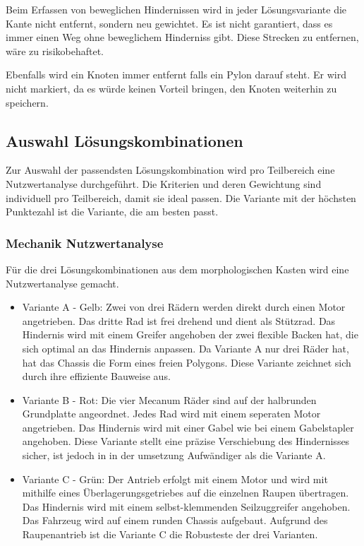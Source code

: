Beim Erfassen von beweglichen Hindernissen wird in jeder Lösungsvariante die Kante nicht entfernt, sondern neu gewichtet. Es ist nicht garantiert, dass es immer einen Weg ohne beweglichem Hinderniss gibt. Diese Strecken zu entfernen, wäre zu risikobehaftet.

Ebenfalls wird ein Knoten immer entfernt falls ein Pylon darauf steht. Er wird nicht markiert, da es würde keinen Vorteil bringen, den Knoten weiterhin zu speichern.


\newpage
\subsection{Auswahl Lösungskombinationen}\label{nutzwertanalyse}

Zur Auswahl der passendsten Lösungskombination wird pro Teilbereich eine Nutzwertanalyse durchgeführt. Die Kriterien und deren Gewichtung sind individuell pro Teilbereich, damit sie ideal passen. Die Variante mit der höchsten Punktezahl ist die Variante, die am besten passt.

\subsubsection{Mechanik Nutzwertanalyse}

Für die  drei Lösungskombinationen aus dem morphologischen Kasten wird eine Nutzwertanalyse gemacht.    

\begin{itemize}
    \item Variante A - Gelb: Zwei von drei Rädern werden direkt durch einen Motor angetrieben. Das dritte Rad ist frei drehend und dient als Stützrad. Das Hindernis wird mit einem Greifer angehoben der zwei flexible Backen hat, die sich optimal an das Hindernis anpassen. Da Variante A nur drei Räder hat, hat das Chassis die Form eines freien Polygons. Diese Variante zeichnet sich durch ihre effiziente Bauweise aus. 
    \item Variante B - Rot: Die vier Mecanum Räder sind auf der halbrunden Grundplatte angeordnet. Jedes Rad wird mit einem seperaten Motor angetrieben.  Das Hindernis wird mit einer Gabel wie bei einem Gabelstapler angehoben. Diese Variante stellt eine präzise Verschiebung des Hindernisses sicher, ist jedoch in in der umsetzung Aufwändiger als die Variante A. 
    \item Variante C - Grün: Der Antrieb erfolgt mit einem Motor und wird mit mithilfe eines Überlagerungsgetriebes auf die einzelnen Raupen übertragen.  Das Hindernis wird mit einem selbst-klemmenden Seilzuggreifer angehoben. Das Fahrzeug wird auf einem runden Chassis aufgebaut. Aufgrund des Raupenantrieb ist die Variante C die Robusteste der drei Varianten. 
\end{itemize}

